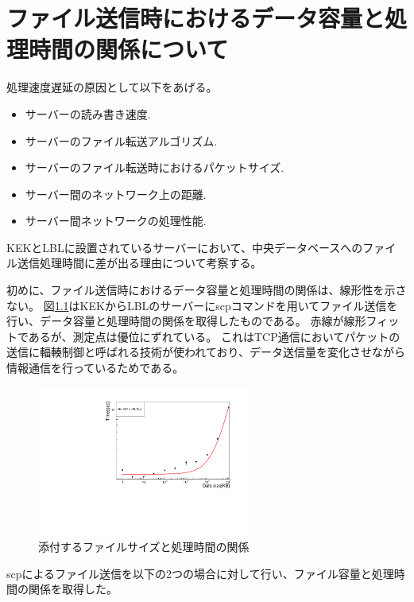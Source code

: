 \chapter{ファイル送信時におけるデータ容量と処理時間の関係について} \label{chap:data_time_detail}

処理速度遅延の原因として以下をあげる。
\begin{itemize}
  \item サーバーの読み書き速度.
  \item サーバーのファイル転送アルゴリズム.
  \item サーバーのファイル転送時におけるパケットサイズ.
  \item サーバー間のネットワーク上の距離.
  \item サーバー間ネットワークの処理性能.
\end{itemize}

KEKとLBLに設置されているサーバーにおいて、中央データベースへのファイル送信処理時間に差が出る理由について考察する。

初めに、ファイル送信時におけるデータ容量と処理時間の関係は、線形性を示さない。
図\ref{datasize_vs_time_scp}はKEKからLBLのサーバーにscpコマンドを用いてファイル送信を行い、データ容量と処理時間の関係を取得したものである。
赤線が線形フィットであるが、測定点は優位にずれている。
これはTCP通信においてパケットの送信に輻輳制御と呼ばれる技術が使われており、データ送信量を変化させながら情報通信を行っているためである。

\begin{figure}[bpt]\centering
  \begin{center}
    \includegraphics[width=7cm,angle=270]{datasize_vs_time_scp.pdf}
  \caption[添付するファイルサイズと処理時間の関係]{添付するファイルサイズと処理時間の関係}
  \label{datasize_vs_time_scp}
  \end{center}
\end{figure}

scpによるファイル送信を以下の2つの場合に対して行い、ファイル容量と処理時間の関係を取得した。

